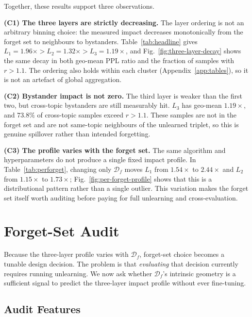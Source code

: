 \documentclass[11pt]{article}
\newcommand{\Df}{\mathcal{D}_f}
\newcommand{\Lone}{L_1}
\newcommand{\Ltwo}{L_2}
\newcommand{\Lthree}{L_3}
\begin{document}
Together, these results support three observations.

\textbf{(C1) The three layers are strictly decreasing.}
The layer ordering is not an arbitrary binning choice: the measured impact
decreases monotonically from the forget set to neighbours to bystanders.
Table~\ref{tab:headline} gives
$\Lone{=}1.96\times{>}\Ltwo{=}1.32\times{>}\Lthree{=}1.19\times$, and
Fig.~\ref{fig:three-layer-decay} shows the same decay in both geo-mean PPL
ratio and the fraction of samples with $r{>}1.1$. The ordering also holds
within each cluster (Appendix~\ref{app:tables}), so it is not an artefact of
global aggregation.

\textbf{(C2) Bystander impact is not zero.}
The third layer is weaker than the first two, but cross-topic bystanders are
still measurably hit. $\Lthree$ has geo-mean $1.19\times$, and $73.8\%$ of
cross-topic samples exceed $r{>}1.1$. These samples are not in the forget set
and are not same-topic neighbours of the unlearned triplet, so this is genuine
spillover rather than intended forgetting.

\textbf{(C3) The profile varies with the forget set.}
The same algorithm and hyperparameters do not produce a single fixed impact
profile. In Table~\ref{tab:perforget}, changing only $\Df$ moves $\Lone$
from $1.54\times$ to $2.44\times$ and $\Ltwo$ from $1.15\times$ to
$1.73\times$; Fig.~\ref{fig:per-forget-profile} shows that this is a
distributional pattern rather than a single outlier. This variation makes the
forget set itself worth auditing before paying for full unlearning and
cross-evaluation.

\section{Forget-Set Audit}
\label{sec:audit}

Because the three-layer profile varies with $\Df$, forget-set choice becomes a
tunable design decision. The problem is that \emph{evaluating} that decision
currently requires running unlearning. We now ask whether $\Df$'s intrinsic
geometry is a sufficient signal to predict the three-layer impact profile
without ever fine-tuning.

\subsection{Audit Features}
\label{sec:features}
\end{document}
